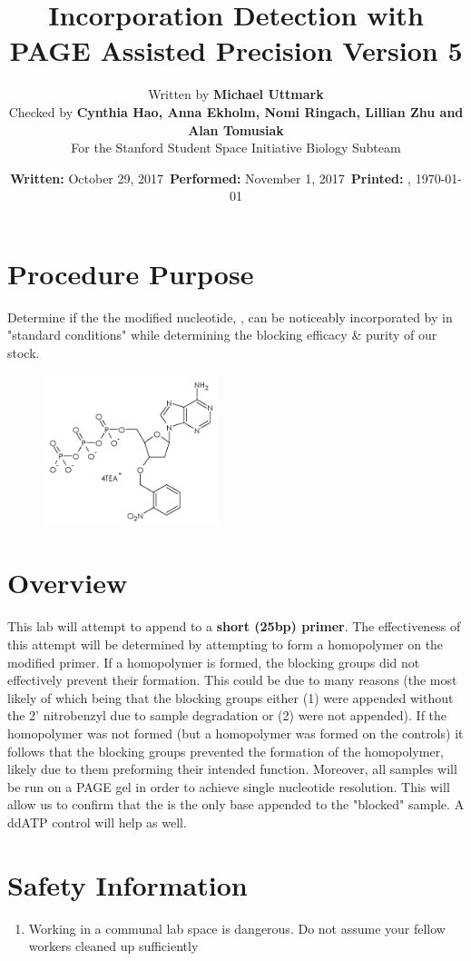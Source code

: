 \documentclass{ssiBio}
\title{\BdATP{} Incorporation Detection with PAGE Assisted Precision Version 5} %
\author{Written by \textbf{Michael Uttmark}\\ %
		Checked by \textbf{Cynthia Hao, Anna Ekholm, Nomi Ringach, Lillian Zhu and Alan Tomusiak}\\ %
        For the Stanford Student Space Initiative Biology Subteam}
\date{\textbf{Written:} October 29, 2017 \,\textbf{Performed:} November 1, 2017 \,\textbf{Printed:} \currenttime{}, \today{}}
\begin{document}
\maketitle
\section{Procedure Purpose} %
Determine if the the modified nucleotide, \BdATP{}, can be noticeably incorporated by \tdt{} in "standard conditions" while determining the blocking efficacy \& purity of our \BdATP{} stock.
\begin{figure}[ht]
\centering
\includegraphics[width=2in]{./resources/BdATP-Structure.png}
\caption{\BdATP{}}
\label{bdatp}
\end{figure}
\section{Overview} %
This lab will attempt to append \BdATP{} to a \textbf{short (25bp) primer}. The effectiveness of this attempt will be determined by attempting to form a homopolymer on the modified primer. If a homopolymer is formed, the blocking groups did not effectively prevent their formation. This could be due to many reasons (the most likely of which being that the blocking groups either (1) were appended without the 2' nitrobenzyl due to sample degradation or (2) were not appended). If the homopolymer was not formed (but a homopolymer was formed on the controls) it follows that the blocking groups prevented the formation of the homopolymer, likely due to them preforming their intended function. Moreover, all samples will be run on a PAGE gel in order to achieve single nucleotide resolution. This will allow us to confirm that the \BdATP{} is the only base appended to the "blocked" sample. A ddATP control will help as well.

\section{Safety Information}
\begin{safety}
\begin{enumerate}
\SYBRGOLD{} %
\tdtSafety{}
\item{Working in a communal lab space is dangerous. Do not assume your fellow workers cleaned up sufficiently}
\end{enumerate}
\end{safety}
\end{document}

